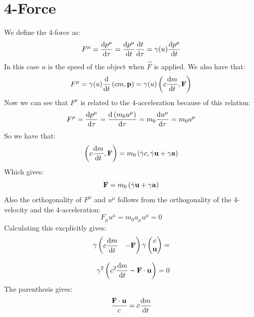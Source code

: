 \section{4-Force}
We define the 4-force as:
\begin{equation}
  F^{\mu} = \dv{p^{\mu}}{\tau} = \dv{p^{\mu}}{t} \dv{t}{\tau} = \gamma (u)\dv{p^{\mu}}{t}
\end{equation}
In this case $u$ is the speed of the object when $\vec{F}$ is applied. We also have that:
\begin{equation}
  F^{\mu} = \gamma(u)\dv{}{t}\brackets{cm, \vec{p}} = \gamma(u) \brackets{c\dv{m}{t}, \vec{F}}
\end{equation}
Now we can see that $F^{\mu}$ is related to the 4-acceleration because of this relation:
\begin{equation}
  F^{\mu} = \dv{p^{\mu}}{\tau} = \dv{\brackets{m_0u^{\mu}}}{\tau} = m_0\dv{u^{\mu}}{\tau} = m_0 a^{\mu}
\end{equation}
So we have that:
\begin{equation}
  \brackets{c \dv{m}{t}, \vec{F}} = m_0\brackets{\dot{\gamma}c, \dot{\gamma}\vec{u} + \gamma\vec{a}}
\end{equation}
Which gives:
\begin{equation}
  \vb{F} = m_0\left(\dot{\gamma}\vb{u} + \gamma\vb{a}\right)
\end{equation}
Also the orthogonality of $F^{\mu}$ and $u^{\mu}$ follows from the orthogonality of the 4-velocity and the 4-acceleration:
\begin{equation}
  F_{\mu}u^{\mu} = m_0 a_{\mu}u^{\mu} = 0
\end{equation}
Calculating this excplicitly gives:
\begin{equation}
  \begin{split}
    \gamma \begin{pmatrix}
    c \dv{m}{t} & -\vec{F}
  \end{pmatrix} \gamma \begin{pmatrix}
    c \\ \vec{u}
  \end{pmatrix} = \\[8pt]
    \gamma^2 \brackets{c^2 \dv{m}{t} - \vec{F}\cdot\vec{u}} = 0
  \end{split}
\end{equation}
The parenthesis gives:
\begin{equation} \label{e:F_dmdt_equivalence}
  \dfrac{\vec{F}\cdot\vec{u}}{c} = c \dv{m}{t}
\end{equation}

